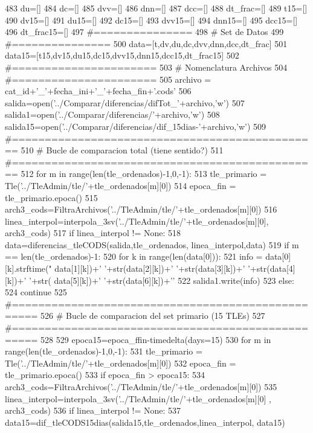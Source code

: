 \begin{DoxyCode}
483     du=[]
484     dc=[]
485     dvv=[]
486     dnn=[]
487     dcc=[]
488     dt_frac=[]
489     t15=[]
490     dv15=[]
491     du15=[]
492     dc15=[]
493     dvv15=[]
494     dnn15=[]
495     dcc15=[]
496     dt_frac15=[]
497     #===============
498     # Set de Datos
499     #===============
500     data=[t,dv,du,dc,dvv,dnn,dcc,dt_frac]
501     data15=[t15,dv15,du15,dc15,dvv15,dnn15,dcc15,dt_frac15]
502     #======================
503     # Nomenclatura Archivos
504     #======================
505     archivo = cat_id+'_'+fecha_ini+'_'+fecha_fin+'.cods'    
506     salida=open('../Comparar/diferencias/difTot_'+archivo,'w')
507     salida1=open('../Comparar/diferencias/'+archivo,'w')
508     salida15=open('../Comparar/diferencias/dif_15dias-'+archivo,'w')
509     #===============================================
510     # Bucle de comparacion total  (tiene sentido?)
511     #===============================================
512     for m in range(len(tle_ordenados)-1,0,-1):
513         tle_primario = Tle('../TleAdmin/tle/'+tle_ordenados[m][0])
514         epoca_fin = tle_primario.epoca()
515         arch3_cods=FiltraArchivos('../TleAdmin/tle/'+tle_ordenados[m][0])
516         linea_interpol=interpola_3sv('../TleAdmin/tle/'+tle_ordenados[m][0], 
      arch3_cods)
517         if linea_interpol != None:                 
518             data=diferencias_tleCODS(salida,tle_ordenados, linea_interpol,data)
519             if m == len(tle_ordenados)-1:
520                 for k in range(len(data[0])):
521                     info = data[0][k].strftime("%
      data[1][k])+' '+str(data[2][k])+' '+str(data[3][k])+' '+str(data[4][k])+' '+str(
      data[5][k])+' '+str(data[6][k])+'\n'
522                     salida1.write(info)
523         else:
524             continue
525     #================================================== 
526     # Bucle de comparacion del set primario (15 TLEs)
527     #==================================================
528     
529     epoca15=epoca_ffin-timedelta(days=15)
530     for m in range(len(tle_ordenados)-1,0,-1):
531         tle_primario = Tle('../TleAdmin/tle/'+tle_ordenados[m][0])
532         epoca_fin = tle_primario.epoca()
533         if epoca_fin > epoca15:
534             arch3_cods=FiltraArchivos('../TleAdmin/tle/'+tle_ordenados[m][0])
535             linea_interpol=interpola_3sv('../TleAdmin/tle/'+tle_ordenados[m][0]
      , arch3_cods)
536             if linea_interpol != None:                   
537                 data15=dif_tleCODS15dias(salida15,tle_ordenados,linea_interpol,
      data15)

\end{DoxyCode}
